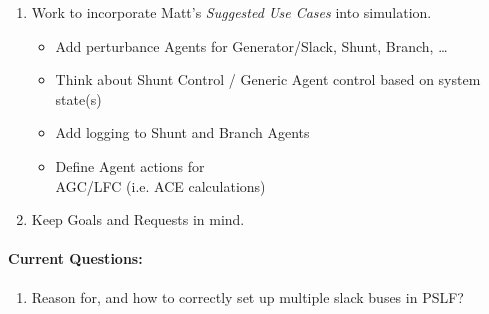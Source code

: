 \documentclass[12pt]{article}
\begin{document}
\begin{multicols}{2}
\begin{enumerate}
		\item Work to incorporate Matt's \emph{Suggested Use Cases} into simulation.
		\begin{itemize}
		\item Add perturbance Agents for Generator/Slack, Shunt, Branch, \ldots
		\item Think about Shunt Control / Generic Agent control based on system state(s)
		\item Add logging to Shunt and Branch Agents
		
		\item Define Agent actions for \\ AGC/LFC (i.e. ACE calculations)
		
		\end{itemize}
		\item Keep Goals and Requests in mind.
		

	\end{enumerate}

	\paragraph{Current Questions:}
	\begin{enumerate}
	\item Reason for, and how to correctly set up multiple slack buses in PSLF?

		


		

\end{enumerate}
\end{multicols}
\end{document}
